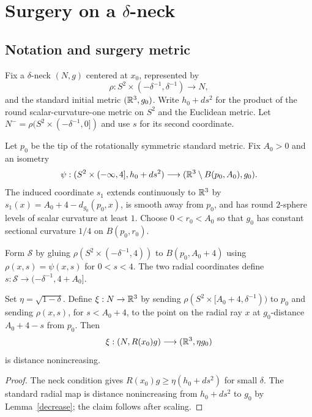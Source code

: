 \chapter{Surgery on a $\delta$-neck}
\label{chap:surgery-delta-neck}

\section{Notation and surgery metric}
\label{necksurgery}

Fix a $\delta$-neck $(N,g)$ centered at $x_0$, represented by
\[
  \rho:S^2\times(-\delta^{-1},\delta^{-1})\longrightarrow N,
\]
and the standard initial metric $(\mathbb{R}^3,g_0)$. Write $h_0+ds^2$ for the
product of the round scalar-curvature-one metric on $S^2$ and the Euclidean
metric. Let $N^-=\rho(S^2\times(-\delta^{-1},0])$ and use $s$ for its second
coordinate.

Let $p_0$ be the tip of the rotationally symmetric standard metric. Fix
$A_0>0$ and an isometry
\[
  \psi:(S^2\times(-\infty,4],h_0+ds^2)
  \longrightarrow(\mathbb{R}^3\setminus B(p_0,A_0),g_0).
\]
The induced coordinate $s_1$ extends continuously to $\mathbb{R}^3$ by
$s_1(x)=A_0+4-d_{g_0}(p_0,x)$, is smooth away from $p_0$, and has round
$2$-sphere levels of scalar curvature at least $1$. Choose
$0<r_0<A_0$ so that $g_0$ has constant sectional curvature $1/4$ on
$B(p_0,r_0)$.

Form ${\mathcal S}$ by gluing
$\rho(S^2\times(-\delta^{-1},4))$ to $B(p_0,A_0+4)$ using $\rho(x,s)=\psi(x,s)$
for $0<s<4$. The two radial coordinates define
$s:{\mathcal S}\to(-\delta^{-1},4+A_0]$.

\begin{claim}
\label{claim:neck-to-cap-distance-decreasing}
\label{distdecrease}
Set $\eta=\sqrt{1-\delta}$. Define $\xi:N\to\mathbb{R}^3$ by sending
$\rho(S^2\times[A_0+4,\delta^{-1}))$ to $p_0$ and sending
$\rho(x,s)$, for $s<A_0+4$, to the point on the radial ray $x$ at
$g_0$-distance $A_0+4-s$ from $p_0$. Then
\[
  \xi:(N,R(x_0)g)\longrightarrow(\mathbb{R}^3,\eta g_0)
\]
is distance nonincreasing.
\end{claim}

\begin{proof}
\sketch
{}
The neck condition gives
$R(x_0)g\geq\eta(h_0+ds^2)$ for small $\delta$. The standard radial map is
distance nonincreasing from $h_0+ds^2$ to $g_0$ by Lemma~\ref{decrease}; the
claim follows after scaling.
\end{proof}

